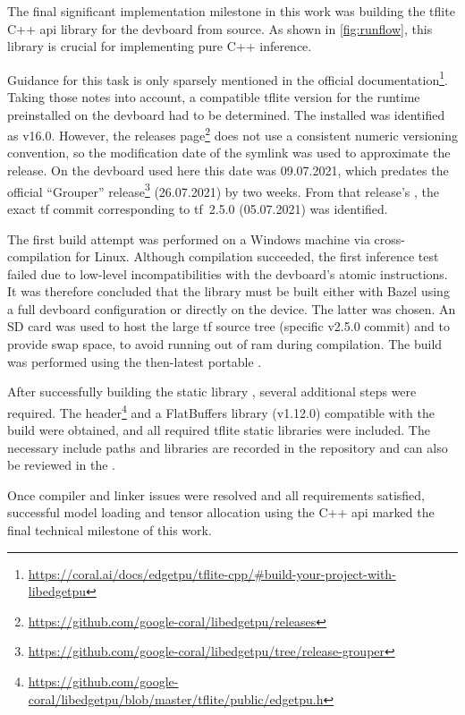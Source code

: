 {The final significant implementation milestone in this work was building the \gls{tflite} C++ \gls{api} library for the \gls{devboard} from source.
As shown in \autoref{fig:runflow}, this library is crucial for implementing pure C++ inference.

Guidance for this task is only sparsely mentioned in the official documentation\footnote{\url{https://coral.ai/docs/edgetpu/tflite-cpp/\#build-your-project-with-libedgetpu}}.
Taking those notes into account, a compatible \gls{tflite} version for the  runtime preinstalled on the \gls{devboard} had to be determined.
The installed  was identified as v16.0. However, the releases page\footnote{\url{https://github.com/google-coral/libedgetpu/releases}}
does not use a consistent numeric versioning convention, so the modification date of the  symlink was used to approximate the release.
On the \gls{devboard} used here this date was 09.07.2021,
which predates the official “Grouper”  release\footnote{\url{https://github.com/google-coral/libedgetpu/tree/release-grouper}} (26.07.2021) by two weeks.
From that release's , the exact \gls{tf} commit corresponding to \gls{tf}~2.5.0 (05.07.2021) was identified.

The first build attempt was performed on a Windows machine via cross-compilation for  Linux.
Although compilation succeeded, the first inference test failed due to low-level incompatibilities with the \gls{devboard}'s atomic instructions.
It was therefore concluded that the library must be built either with Bazel using a full \gls{devboard} configuration or directly on the device.
The latter was chosen. An SD card was used to host the large \gls{tf} source tree (specific v2.5.0 commit) and to provide swap space,
to avoid running out of \gls{ram} during compilation. The build was performed using the then-latest portable .

After successfully building the static library , several additional steps were required.
The  header\footnote{\url{https://github.com/google-coral/libedgetpu/blob/master/tflite/public/edgetpu.h}} and a FlatBuffers library (v1.12.0) compatible with the build were obtained,
and all required \gls{tflite} static libraries were included.
The necessary include paths and libraries are recorded in the repository and can also be reviewed in the .

Once compiler and linker issues were resolved and all requirements satisfied, successful model loading and tensor allocation using the C++ \gls{api}
marked the final technical milestone of this work.

}
